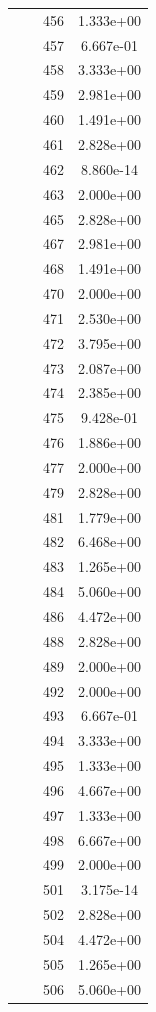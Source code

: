 \documentclass[12pt]{article}
\begin{document}
\begin{longtable}{@{}cccc@{}}
 &  & 456 & 1.333e+00 \\
 &  & 457 & 6.667e-01 \\
 &  & 458 & 3.333e+00 \\
 &  & 459 & 2.981e+00 \\
 &  & 460 & 1.491e+00 \\
 &  & 461 & 2.828e+00 \\
 &  & 462 & 8.860e-14 \\
 &  & 463 & 2.000e+00 \\
 &  & 465 & 2.828e+00 \\
 &  & 467 & 2.981e+00 \\
 &  & 468 & 1.491e+00 \\
 &  & 470 & 2.000e+00 \\
 &  & 471 & 2.530e+00 \\
 &  & 472 & 3.795e+00 \\
 &  & 473 & 2.087e+00 \\
 &  & 474 & 2.385e+00 \\
 &  & 475 & 9.428e-01 \\
 &  & 476 & 1.886e+00 \\
 &  & 477 & 2.000e+00 \\
 &  & 479 & 2.828e+00 \\
 &  & 481 & 1.779e+00 \\
 &  & 482 & 6.468e+00 \\
 &  & 483 & 1.265e+00 \\
 &  & 484 & 5.060e+00 \\
 &  & 486 & 4.472e+00 \\
 &  & 488 & 2.828e+00 \\
 &  & 489 & 2.000e+00 \\
 &  & 492 & 2.000e+00 \\
 &  & 493 & 6.667e-01 \\
 &  & 494 & 3.333e+00 \\
 &  & 495 & 1.333e+00 \\
 &  & 496 & 4.667e+00 \\
 &  & 497 & 1.333e+00 \\
 &  & 498 & 6.667e+00 \\
 &  & 499 & 2.000e+00 \\
 &  & 501 & 3.175e-14 \\
 &  & 502 & 2.828e+00 \\
 &  & 504 & 4.472e+00 \\
 &  & 505 & 1.265e+00 \\
 &  & 506 & 5.060e+00 \\

\end{longtable}
\end{document}
